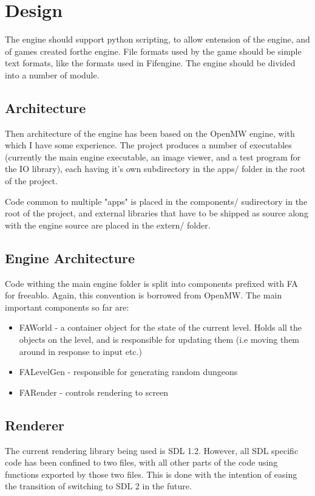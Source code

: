   \section{Design}
    The engine should support python scripting, to allow entension of the engine, and of games created forthe engine.
    File formats used by the game should be simple text formats, like the formats used in Fifengine.
    The engine should be divided into a number of module.
    
    \subsection{Architecture}
    Then architecture of the engine has been based on the OpenMW\cite{openmw} engine, with which I have some experience.
    The project produces a number of executables (currently the main engine executable, an image viewer, and a test program for the IO library), each having it's own subdirectory in the apps/ folder in the root of the project.
    
    Code common to multiple "apps" is placed in the components/ sudirectory in the root of the project, and external libraries that have to be shipped as source along with the engine source are placed in the extern/ folder.
    
    \subsection{Engine Architecture}
    Code withing the main engine folder is split into components prefixed with FA for freeablo. Again, this convention is borrowed from OpenMW\cite{openmw}.
    The main important components so far are:
    \begin{itemize}
        \item{FAWorld - a container object for the state of the current level. Holds all the objects on the level, and is responsible for updating them (i.e moving them around in response to input etc.)}
        \item{FALevelGen - responsible for generating random dungeons}
        \item{FARender - controls rendering to screen}
    \end{itemize}

    \subsection{Renderer}
    The current rendering library being used is SDL 1.2. However, all SDL specific code has been confined to two files, with all other parts of the code using functions exported by those two files. This is done with the intention of easing the transition of switching to SDL 2 in the future.
    
